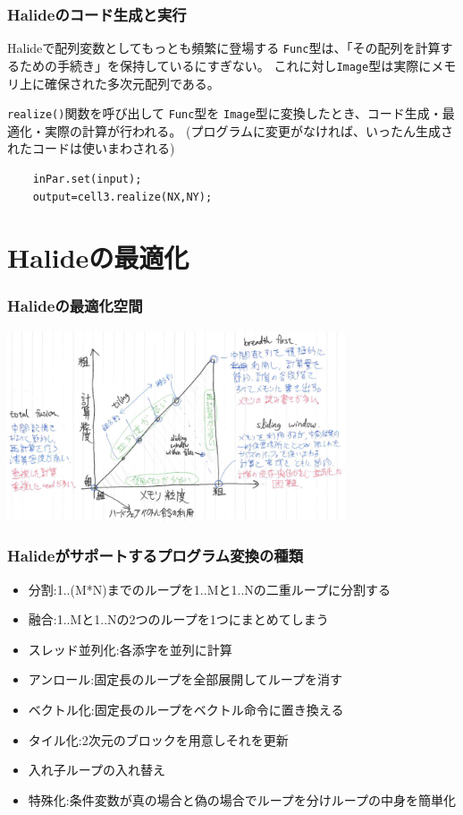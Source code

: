\documentclass[dvipdfmx,cjk]{beamer}
\begin{document}
\begin{frame}[fragile]\frametitle{Halideのコード生成と実行}

Halideで配列変数としてもっとも頻繁に登場する
{\tt Func}型は、「その配列を計算するための手続き」を保持しているにすぎない。
これに対し{\tt Image}型は実際にメモリ上に確保された多次元配列である。

{\tt realize()}関数を呼び出して
{\tt Func}型を
{\tt Image}型に変換したとき、コード生成・最適化・実際の計算が行われる。
(プログラムに変更がなければ、いったん生成されたコードは使いまわされる)

\begingroup
    \fontsize{9pt}{10pt}\selectfont
\begin{verbatim}
    inPar.set(input);
    output=cell3.realize(NX,NY);
\end{verbatim}
\endgroup

\end{frame}


\section{Halideの最適化} 
\begin{frame}\frametitle{Halideの最適化空間}
\begin{center}
\includegraphics[width=10cm]{figure/doc/schedule-space.png}
\end{center}
\end{frame}


\begin{frame}\frametitle{Halideがサポートするプログラム変換の種類}
\begin{itemize}
  \item 分割:1..(M*N)までのループを1..Mと1..Nの二重ループに分割する
  \item 融合:1..Mと1..Nの2つのループを1つにまとめてしまう
  \item スレッド並列化:各添字を並列に計算
  \item アンロール:固定長のループを全部展開してループを消す
  \item ベクトル化:固定長のループをベクトル命令に置き換える
  \item タイル化:2次元のブロックを用意しそれを更新
  \item 入れ子ループの入れ替え
  \item 特殊化:条件変数が真の場合と偽の場合でループを分けループの中身を簡単化
\end{itemize}
\end{frame}
\end{document}
